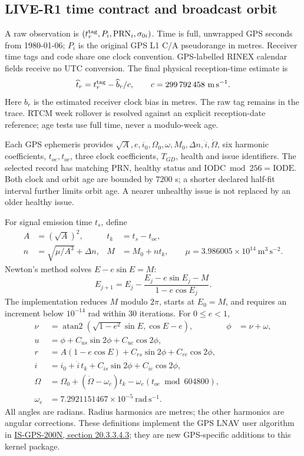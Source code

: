 \clearpage
\subsection{LIVE-R1 time contract and broadcast orbit}
\label{sec:live-orbit}

A raw observation is $(t_r^{\rm tag},P_i,\mathrm{PRN}_i,\sigma_{0i})$.
Time is full, unwrapped GPS seconds from 1980-01-06; $P_i$ is the original
GPS L1 C/A pseudorange in metres. Receiver time tags and code share one clock
convention. GPS-labelled RINEX calendar fields receive no UTC conversion.
The final physical reception-time estimate is
\begin{equation}
 \widehat t_r=t_r^{\rm tag}-\widehat b_r/c,
 \qquad c=299\,792\,458\ \mathrm{m\,s^{-1}}.
 \label{eq:live-reception-time}
\end{equation}
Here $b_r$ is the estimated receiver clock bias in metres. The raw tag remains
in the trace. RTCM week rollover is resolved against an explicit reception-date
reference; age tests use full time, never a modulo-week age.

Each GPS ephemeris provides $\sqrt A,e,i_0,\Omega_0,\omega,M_0,\Delta n,
\dot i,\dot\Omega$, six harmonic coefficients, $t_{oe},t_{oc}$, three clock
coefficients, $T_{GD}$, health and issue identifiers. The selected record has
matching PRN, healthy status and $\mathrm{IODC}\bmod256=\mathrm{IODE}$.
Both clock and orbit age are bounded by $7200$ s; a shorter declared half-fit
interval further limits orbit age. A nearer unhealthy issue is not replaced
by an older healthy issue.

For signal emission time $t_s$, define
\begin{align}
 A&=(\sqrt A)^2,&t_k&=t_s-t_{oe},\\
 n&=\sqrt{\mu/A^3}+\Delta n,&M&=M_0+n t_k,
 \qquad \mu=3.986005\times10^{14}\ \mathrm{m^3\,s^{-2}}.
\end{align}
Newton's method solves $E-e\sin E=M$:
\begin{equation}
 E_{j+1}=E_j-\frac{E_j-e\sin E_j-M}{1-e\cos E_j}.
\end{equation}
The implementation reduces $M$ modulo $2\pi$, starts at $E_0=M$, and requires
an increment below $10^{-14}$ rad within 30 iterations. For $0\leq e<1$,
\begin{align}
 \nu&=\operatorname{atan2}\!\left(\sqrt{1-e^2}\sin E,\cos E-e\right),
 &\phi&=\nu+\omega,\\
 u&=\phi+C_{us}\sin2\phi+C_{uc}\cos2\phi,\\
 r&=A(1-e\cos E)+C_{rs}\sin2\phi+C_{rc}\cos2\phi,\\
 i&=i_0+\dot i\,t_k+C_{is}\sin2\phi+C_{ic}\cos2\phi,\\
 \Omega&=\Omega_0+(\dot\Omega-\omega_e)t_k
                  -\omega_e(t_{oe}\bmod604800),\\
 \omega_e&=7.2921151467\times10^{-5}\ \mathrm{rad\,s^{-1}}.
\end{align}
All angles are radians. Radius harmonics are metres; the other harmonics are
angular corrections. These definitions implement the GPS LNAV user algorithm
in \href{https://www.gps.gov/sites/default/files/2025-07/IS-GPS-200N.pdf}{IS-GPS-200N,
section 20.3.3.4.3}; they are new GPS-specific additions to this kernel package.

